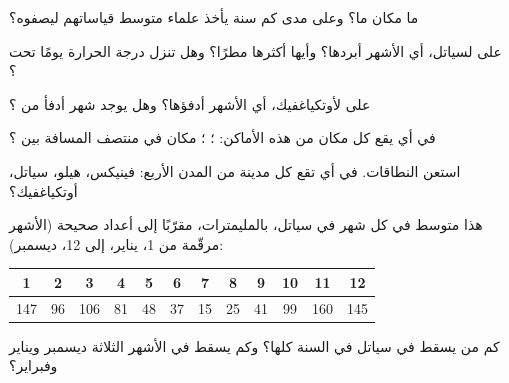 \begin{exercise}[$\star$]\label{exo:g5:weather-and-climate:2}
ما  مكان ما؟ وعلى مدى كم سنة يأخذ علماء  متوسط
قياساتهم ليصفوه؟
\end{exercise}

\begin{exercise}[$\star$]\label{exo:g5:weather-and-climate:3}
على  لسياتل، أي الأشهر أبردها؟ وأيها
أكثرها مطرًا؟ وهل تنزل درجة الحرارة يومًا تحت ؟
\end{exercise}

\begin{exercise}[$\star$]\label{exo:g5:weather-and-climate:4}
على  لأوتكياغفيك، أي الأشهر أدفؤها؟ وهل يوجد
شهر أدفأ من ؟
\end{exercise}

\begin{exercise}[$\star$]\label{exo:g5:weather-and-climate:5}
في أي  يقع كل مكان من هذه الأماكن: ؛ ؛ مكان في منتصف المسافة بين  ؟
\end{exercise}

\begin{exercise}[$\star$]\label{exo:g5:weather-and-climate:6}
استعن  النطاقات. في أي  تقع كل مدينة من المدن الأربع:
فينيكس، هيلو، سياتل، أوتكياغفيك؟
\end{exercise}

\begin{exercise}[$\star\star$]\label{exo:g5:weather-and-climate:7}
هذا متوسط  في كل شهر في سياتل، بالمليمترات، مقرّبًا
إلى أعداد صحيحة (الأشهر مرقّمة من 1، يناير، إلى 12، ديسمبر):
\begin{center}
\begin{tabular}{|*{12}{c|}}
\hline
1 & 2 & 3 & 4 & 5 & 6 & 7 & 8 & 9 & 10 & 11 & 12\\
\hline
147 & 96 & 106 & 81 & 48 & 37 & 15 & 25 & 41 & 99 & 160 & 145\\
\hline
\end{tabular}
\end{center}
كم من  يسقط في سياتل في السنة كلها؟ وكم يسقط في
الأشهر الثلاثة ديسمبر ويناير وفبراير؟
\end{exercise}

